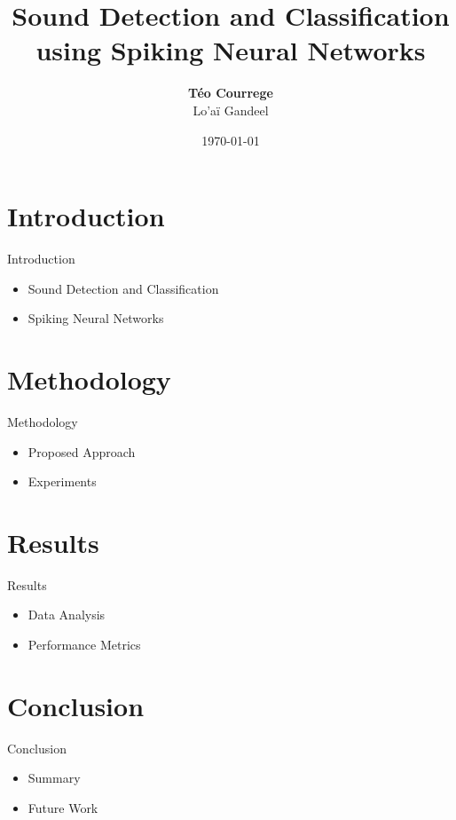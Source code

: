 \documentclass[aspectratio=169, 11pt]{beamer}
\title[Sound Detection and Classification]{\textbf{Sound Detection and Classification}\\ using Spiking Neural Networks}
\author[T. Courrege, L. Gandeel]{\textbf{Téo Courrege}\\Lo'aï Gandeel}
\date{\today}
\begin{document}
\begin{frame}[plain]
  \titlepage
\end{frame}

\section{Introduction}

\begin{frame}{Introduction}
  \begin{itemize}
    \item Sound Detection and Classification
    \item Spiking Neural Networks
  \end{itemize}
\end{frame}

\section{Methodology}

\begin{frame}{Methodology}
  \begin{itemize}
    \item Proposed Approach
    \item Experiments
  \end{itemize}
\end{frame}

\section{Results}

\begin{frame}{Results}
  \begin{itemize}
    \item Data Analysis
    \item Performance Metrics
  \end{itemize}
\end{frame}

\section{Conclusion}

\begin{frame}{Conclusion}
  \begin{itemize}
    \item Summary
    \item Future Work
  \end{itemize}
\end{frame}
\end{document}
